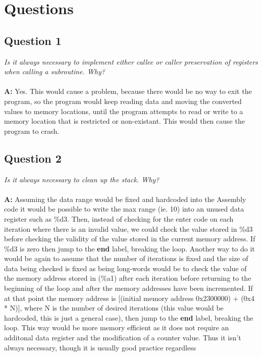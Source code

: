 \documentclass[letterpaper]{article}
\begin{document}
\section{Questions}

    \subsection{Question 1}
      \textit{Is it always necessary to implement either callee or caller preservation of registers when calling a subroutine. Why?}
      \\ \\
      \noindent\textbf{A:}
      Yes. This would cause a problem, because there would be no way to exit the program,
      so the program would keep reading data and moving the converted values to
      memory locations, until the program attempts to read or write to a memory
      location that is restricted or non-existant. This would then cause the
      program to crash.

    \subsection{Question 2}
      \textit{Is it always necessary to clean up the stack. Why?}
      \\ \\
      \noindent\textbf{A:}
      Assuming the data range would be fixed and hardcoded into the Assembly code it would be possible to
      write the max range (ie. 10) into an unused data register such as \%d3.  Then, instead of checking
      for the enter code on each iteration where there is an invalid value, we could check the value stored in
      \%d3 before checking the validity of the value stored in the current memory address.  If \%d3 is
      zero then jump to the \textbf{end} label, breaking the loop.  Another way to do it would be again
      to assume that the number of iterations is fixed and the size of data being checked is fixed as being
      long-words would be to check the value of the memory address stored in (\%a1) after each iteration
      before returning to the beginning of the loop and after the memory addresses have been incremented.
      If at that point the memory address is [(initial memory address 0x2300000) + (0x4 * N)], where N is
      the number of desired iterations (this value would be hardcoded, this is just a general case), then
      jump to the \textbf{end} label, breaking the loop.  This way would be more memory efficient as it
      does not require an additonal data register and the modification of a counter value.  Thus it isn't always necessary, though it is usually good practice regardless
\end{document}
